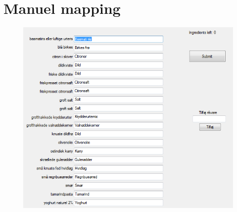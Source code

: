 \chapter{Manuel mapping}
\label{ap:manuel-mapping}

\begin{figure}
\centering
\includegraphics[scale=0.6]{billeder/manuel-mapping.png}
\end{figure}
